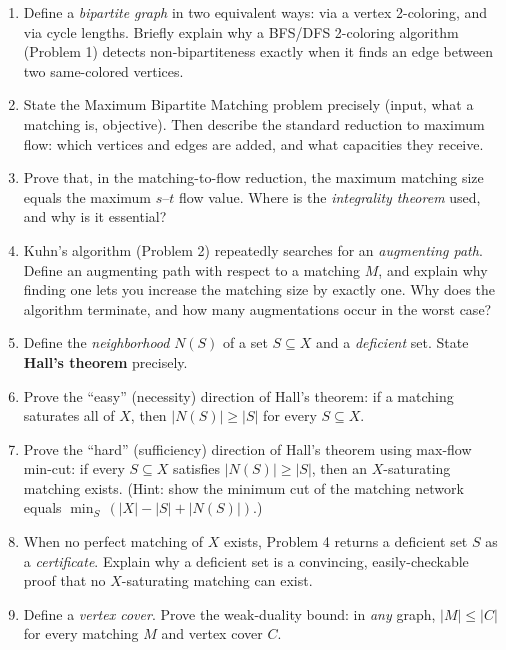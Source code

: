 \documentclass[11pt]{article}
\begin{document}
\begin{enumerate}[label=\textbf{A\arabic*.}, leftmargin=2.2em]

\item Define a \emph{bipartite graph} in two equivalent ways: via a vertex
2-coloring, and via cycle lengths. Briefly explain why a BFS/DFS 2-coloring
algorithm (Problem 1) detects non-bipartiteness exactly when it finds an edge
between two same-colored vertices.

\item State the Maximum Bipartite Matching problem precisely (input, what a
matching is, objective). Then describe the standard reduction to maximum flow:
which vertices and edges are added, and what capacities they receive.

\item Prove that, in the matching-to-flow reduction, the maximum matching size
equals the maximum $s$--$t$ flow value. Where is the \emph{integrality theorem}
used, and why is it essential?

\item Kuhn's algorithm (Problem 2) repeatedly searches for an \emph{augmenting
path}. Define an augmenting path with respect to a matching $M$, and explain why
finding one lets you increase the matching size by exactly one. Why does the
algorithm terminate, and how many augmentations occur in the worst case?

\item Define the \emph{neighborhood} $N(S)$ of a set $S \subseteq X$ and a
\emph{deficient} set. State \textbf{Hall's theorem} precisely.

\item Prove the ``easy'' (necessity) direction of Hall's theorem: if a matching
saturates all of $X$, then $|N(S)| \ge |S|$ for every $S \subseteq X$.

\item Prove the ``hard'' (sufficiency) direction of Hall's theorem using
max-flow min-cut: if every $S \subseteq X$ satisfies $|N(S)| \ge |S|$, then an
$X$-saturating matching exists. (Hint: show the minimum cut of the matching
network equals $\min_{S}\,(|X| - |S| + |N(S)|)$.)

\item When no perfect matching of $X$ exists, Problem 4 returns a deficient set
$S$ as a \emph{certificate}. Explain why a deficient set is a convincing,
easily-checkable proof that no $X$-saturating matching can exist.

\item Define a \emph{vertex cover}. Prove the weak-duality bound: in \emph{any}
graph, $|M| \le |C|$ for every matching $M$ and vertex cover $C$.


\end{enumerate}
\end{document}
